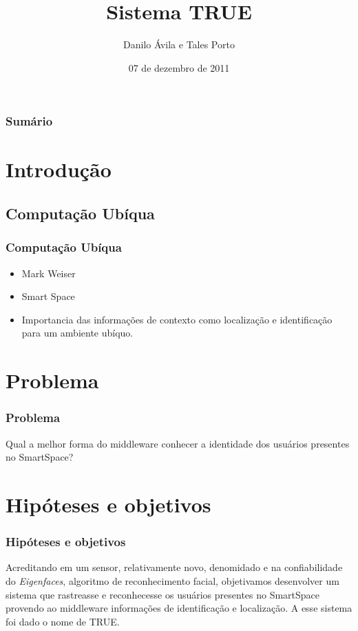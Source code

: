\documentclass{beamer}
\title{Sistema TRUE}
\author{Danilo Ávila e Tales Porto}
\institute[UnB]
{
    Departamento de Ciência da Computação\\
    Instituto de Ciências Exatas\\
    Universidade de Brasília
}
\date{07 de dezembro de 2011}
\begin{document}
\begin{frame}
\titlepage
\end{frame}


\begin{frame}
	\frametitle{Sumário}
	\tableofcontents
\end{frame}


\section{Introdução}

	\subsection{Computação Ubíqua}
		\begin{frame}
	    	\frametitle{Computação Ubíqua}
	    	\begin{itemize}
	    		\item Mark Weiser
	    		\item Smart Space
	    		\item Importancia das informações de contexto como localização e identificação para um ambiente ubíquo.
	    	\end{itemize}
		\end{frame}

\section{Problema}

	\begin{frame}
    	\frametitle{Problema}
    	Qual a melhor forma do middleware conhecer a identidade dos usuários
    	presentes no SmartSpace?
	\end{frame}

\section{Hipóteses e objetivos}

	\begin{frame}
    	\frametitle{Hipóteses e objetivos}
    	Acreditando em um sensor, relativamente novo, denomidado  e
    	na confiabilidade do \textit{Eigenfaces}, algoritmo de reconhecimento
    	facial, objetivamos desenvolver um sistema que rastreasse e reconhecesse os
    	usuários presentes no SmartSpace provendo ao middleware informações de
    	identificação e localização. A esse sistema foi dado o nome de TRUE.
	\end{frame}
	
\end{document}
